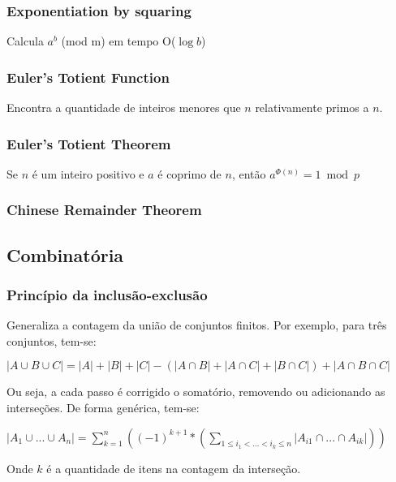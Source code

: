 \subsubsection{Exponentiation by squaring}
Calcula $a^b$ (mod m) em tempo O($\log{b}$)
\divisor

\subsubsection{Euler's Totient Function}
Encontra a quantidade de inteiros menores que $n$ relativamente primos a $n$.
\divisor

\subsubsection{Euler's Totient Theorem}
Se $n$ \'{e} um inteiro positivo e $a$ \'{e} coprimo de $n$, ent\~{a}o
$a^{\Phi (n) } = 1 \bmod{p}$
\divisor

\subsubsection{Chinese Remainder Theorem}
\divisor


\subsection{Combinat\'{o}ria}

\subsubsection{Princ\'{i}pio da inclus\~{a}o-exclus\~{a}o}
Generaliza a contagem da uni\~{a}o de conjuntos finitos. Por exemplo, para tr\^{e}s conjuntos, tem-se:

$|A \cup B \cup C| = |A| + |B| + |C| - (|A \cap B| + |A \cap C| + |B \cap C|) + |A \cap B \cap C|$

Ou seja, a cada passo \'{e} corrigido o somat\'{o}rio, removendo ou adicionando as interse\c{c}\~{o}es. De forma gen\'{e}rica, tem-se:

$|A_1 \cup ... \cup A_n| = \sum_{k=1}^{n} ((-1)^{k+1}*(\sum_{1 \leq i_1 < ... < i_k \leq n} |A_{i1} \cap ... \cap A_{ik}|))$

Onde $k$ \'{e} a quantidade de itens na contagem da interse\c{c}\~{a}o.

